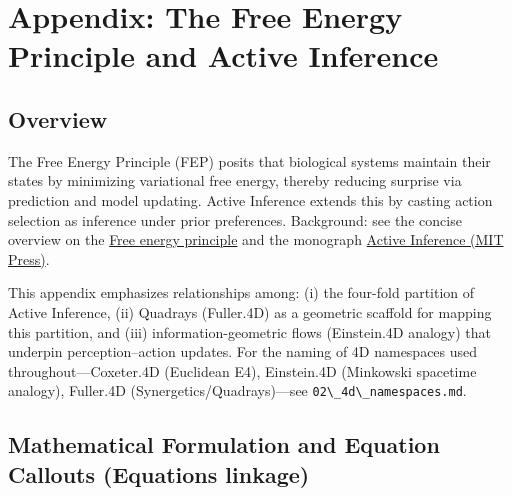 \documentclass[
  10pt,
]{article}
\newcommand{\passthrough}[1]{#1}
\begin{document}
\newpage

\hypertarget{appendix-the-free-energy-principle-and-active-inference}{%
\section{Appendix: The Free Energy Principle and Active
Inference}\label{appendix-the-free-energy-principle-and-active-inference}}

\hypertarget{overview-2}{%
\subsection{Overview}\label{overview-2}}

The Free Energy Principle (FEP) posits that biological systems maintain
their states by minimizing variational free energy, thereby reducing
surprise via prediction and model updating. Active Inference extends
this by casting action selection as inference under prior preferences.
Background: see the concise overview on the
\href{https://en.wikipedia.org/wiki/Free_energy_principle}{Free energy
principle} and the monograph
\href{https://direct.mit.edu/books/oa-monograph/5299/Active-InferenceThe-Free-Energy-Principle-in-Mind}{Active
Inference (MIT Press)}.

This appendix emphasizes relationships among: (i) the four-fold
partition of Active Inference, (ii) Quadrays (Fuller.4D) as a geometric
scaffold for mapping this partition, and (iii) information-geometric
flows (Einstein.4D analogy) that underpin perception--action updates.
For the naming of 4D namespaces used throughout---Coxeter.4D (Euclidean
E4), Einstein.4D (Minkowski spacetime analogy), Fuller.4D
(Synergetics/Quadrays)---see
\passthrough{\lstinline!02\_4d\_namespaces.md!}.

\hypertarget{mathematical-formulation-and-equation-callouts-equations-linkage}{%
\subsection{Mathematical Formulation and Equation Callouts (Equations
linkage)}\label{mathematical-formulation-and-equation-callouts-equations-linkage}}
\end{document}
